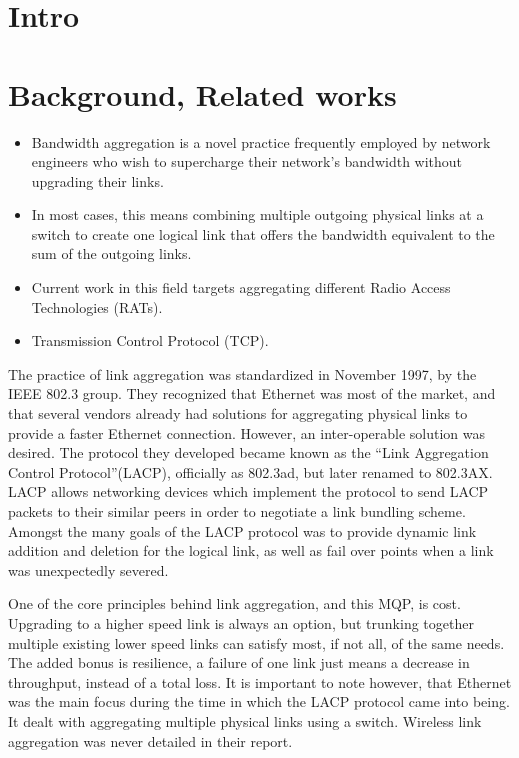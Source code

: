 \documentclass[12pt]{article}
\begin{document}
\section{Intro}


\section{Background, Related works}

	\begin{itemize}
		\item Bandwidth aggregation is a novel practice frequently employed by network engineers who wish to supercharge their network's bandwidth without upgrading their links. 
		\item In most cases, this means combining multiple outgoing physical links at a switch to create one logical link that offers the bandwidth equivalent to the sum of the outgoing links. 
		\item Current work in this field targets aggregating different Radio Access Technologies (RATs).
		\item Transmission Control Protocol (TCP).
	\end{itemize}


	The practice of link aggregation was standardized in November 1997, by the IEEE 802.3 group. They recognized that Ethernet was most of the market, and that several vendors already had solutions for aggregating physical links to provide a faster Ethernet connection. However, an inter-operable solution was desired. The protocol they developed became known as the ``Link Aggregation Control Protocol''(LACP), officially as 802.3ad, but later renamed to 802.3AX. LACP allows networking devices which implement the protocol to send LACP packets to their similar peers in order to negotiate a link bundling scheme. Amongst the many goals of the LACP protocol was to provide dynamic link addition and deletion for the logical link, as well as fail over points when a link was unexpectedly severed. 

	One of the core principles behind link aggregation, and this MQP, is cost. Upgrading to a higher speed link is always an option, but trunking together multiple existing lower speed links can satisfy most, if not all, of the same needs. The added bonus is resilience, a failure of one link just means a decrease in throughput, instead of a total loss. It is important to note however, that Ethernet was the main focus during the time in which the LACP protocol came into being. It dealt with aggregating multiple physical links using a switch. Wireless link aggregation was never detailed in their report.
\end{document}
